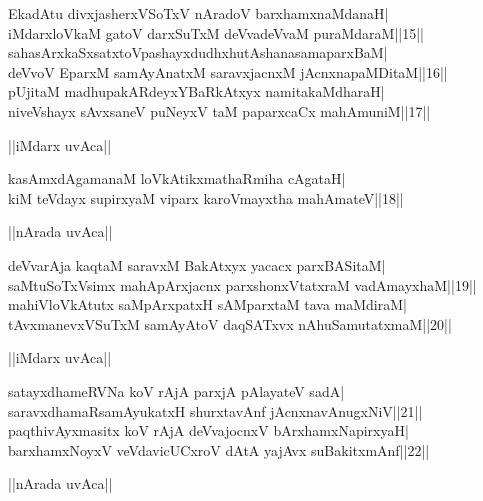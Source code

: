\documentclass{article}
\begin{document}
EkadAtu divxjasherxVSoTxV nAradoV barxhamxnaMdanaH|\\
iMdarxloVkaM gatoV darxSuTxM deVvadeVvaM puraMdaraM||15||\\
sahasArxkaSxsatxtoVpashayxdudhxhutAshanasamaparxBaM|\\
deVvoV EparxM samAyAnatxM saravxjacnxM jAcnxnapaMDitaM||16||\\
pUjitaM madhupakARdeyxYBaRkAtxyx namitakaMdharaH|\\
niveVshayx sAvxsaneV puNeyxV taM paparxcaCx mahAmuniM||17||\\

\begin{center}
||iMdarx uvAca||
\end{center}

kasAmxdAgamanaM loVkAtikxmathaRmiha cAgataH|\\
kiM teVdayx supirxyaM viparx karoVmayxtha mahAmateV||18||\\

\begin{center}
||nArada uvAca||
\end{center}

deVvarAja kaqtaM saravxM BakAtxyx yacacx parxBASitaM|\\
saMtuSoTxVsimx mahApArxjacnx parxshonxVtatxraM vadAmayxhaM||19||\\
mahiVloVkAtutx saMpArxpatxH sAMparxtaM tava maMdiraM|\\
tAvxmanevxVSuTxM samAyAtoV daqSATxvx nAhuSamutatxmaM||20||\\

\begin{center}
||iMdarx uvAca||
\end{center}

satayxdhameRVNa koV rAjA parxjA pAlayateV sadA|\\
saravxdhamaRsamAyukatxH shurxtavAnf jAcnxnavAnugxNiV||21||\\
paqthivAyxmasitx koV rAjA deVvajocnxV bArxhamxNapirxyaH|\\
barxhamxNoyxV veVdavicUCxroV dAtA yajAvx suBakitxmAnf||22||\\

\begin{center}
||nArada uvAca||
\end{center}
\end{document}
